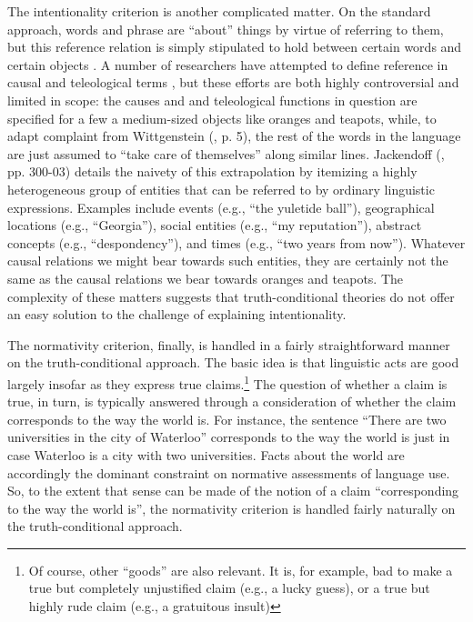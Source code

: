 The intentionality criterion is another complicated matter. On the standard approach, words and phrase are ``about'' things by virtue of referring to them, but this reference relation is simply stipulated to hold between certain words and certain objects \citep{Stanley:2008}. A number of researchers have attempted to define reference in causal and teleological terms \citep{Speaks:2014,Dennett:1987,Millikan:1989}, but these efforts are both highly controversial \citep{Horwich:2005} and limited in scope: the causes and and teleological functions in question are specified for a few a medium-sized objects like oranges and teapots, while, to adapt complaint from Wittgenstein (\citeyear{Wittgenstein:1953}, p. 5), the rest of the words in the language are just assumed to ``take care of themselves'' along similar lines. Jackendoff (\citeyear{Jackendoff:2002}, pp. 300-03) details the naivety of this extrapolation by itemizing a highly heterogeneous group of entities that can be referred to by ordinary linguistic expressions. Examples include events (e.g., ``the yuletide ball''), geographical locations (e.g., ``Georgia''), social entities (e.g., ``my reputation''), abstract concepts (e.g., ``despondency''), and times (e.g., ``two years from now''). Whatever causal relations we might bear towards such entities, they are certainly not the same as the causal relations we bear towards oranges and teapots. The complexity of these matters suggests that truth-conditional theories do not offer an easy solution to the challenge of explaining intentionality.

The normativity criterion, finally, is handled in a fairly straightforward manner on the truth-conditional approach. The basic idea is that linguistic acts are good largely insofar as they express true claims.\footnote{Of course, other ``goods'' are also relevant. It is, for example, bad to make a true but completely unjustified claim (e.g., a lucky guess), or a true but highly rude claim (e.g., a gratuitous insult)} The question of whether a claim is true, in turn, is typically answered through a consideration of whether the claim corresponds to the way the world is. For instance, the sentence ``There are two universities in the city of Waterloo'' corresponds to the way the world is just in case Waterloo is a city with two universities. Facts about the world are accordingly the dominant constraint on normative assessments of language use. So, to the extent that sense can be made of the notion of a claim ``corresponding to the way the world is'', the normativity criterion is handled fairly naturally on the truth-conditional approach.

